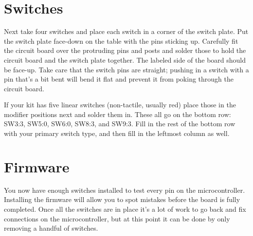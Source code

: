 \documentclass{article}
\begin{document}
\section{Switches}

Next take four switches and place each switch in a corner of the
switch plate. Put the switch plate face-down on the table with the
pins sticking up. Carefully fit the circuit board over the protruding
pins and posts and solder those to hold the circuit board and the
switch plate together. The labeled side of the board should be
face-up. Take care that the switch pins are straight; pushing in a
switch with a pin that's a bit bent will bend it flat and prevent it
from poking through the circuit board.

\vspace{1em}

If your kit has five linear switches (non-tactile, usually red) place
those in the modifier positions next and solder them in. These all go
on the bottom row: SW3:3, SW5:0, SW6:0, SW8:3, and SW9:3. Fill in the
rest of the bottom row with your primary switch type, and then fill in
the leftmost column as well.

\vspace{1em}
\noindent{}
\vspace{1em}

\section{Firmware}

You now have enough switches installed to test every pin on the
microcontroller. Installing the firmware will allow you to spot
mistakes before the board is fully completed. Once all the switches
are in place it's a lot of work to go back and fix connections on the
microcontroller, but at this point it can be done by only removing a
handful of switches.

\vspace{1em}
\end{document}
